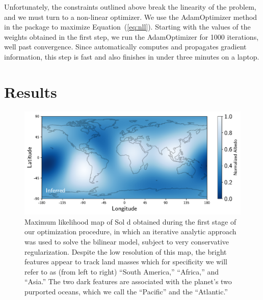 \documentclass[modern]{aastex62}
\begin{document}
Unfortunately, the constraints outlined above break the linearity 
of the problem, and we must turn to a non-linear optimizer. We use the 
\textsf{AdamOptimizer} method in the \tf package \citep{Abadi2015}
to maximize Equation~(\ref{eq:nll}). Starting with the values of the
weights obtained in the first step, we run the \textsf{AdamOptimizer}
for 1000 iterations, well past convergence. Since \tf automatically
computes and propagates gradient information, this step is fast
and also finishes in under three minutes on a laptop.

\section{Results}
\label{sec:results}

\begin{figure}[t!]
    \begin{centering}
    \includegraphics[width=\linewidth]{figures/map_L2.pdf}
    \caption{\label{fig:map_L2}
             Maximum likelihood map of Sol d obtained during the first
             stage of our optimization procedure, in which an iterative
             analytic approach was used to solve the bilinear model, 
             subject to very conservative regularization. Despite the low
             resolution of this map, the bright features appear to track
             land masses which for specificity we will refer to as (from left to right)
             ``South America,'' ``Africa,'' and ``Asia.''
             The two dark features are associated with the planet's
             two purported oceans, which we call the ``Pacific'' and the ``Atlantic.''
             }
    \end{centering}
\end{figure}
\end{document}
